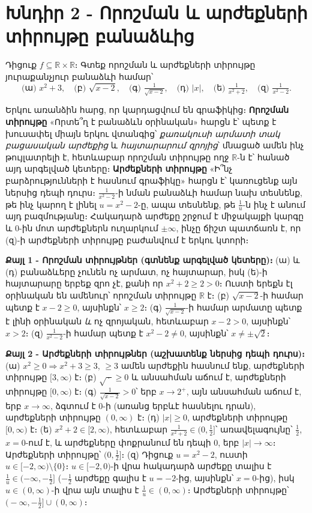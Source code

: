 \documentclass[11pt,a4paper]{article}
\newcommand{\R}{\mathbb{R}}
\begin{document}
\section*{Խնդիր 2 - Որոշման և արժեքների տիրույթը բանաձևից}

\begin{problembox}[2]
Դիցուք $f\subseteq\R\times\R$։ Գտեք որոշման և արժեքների տիրույթը յուրաքանչյուր բանաձևի համար՝
\[
\text{(ա) } x^2+3,\quad
\text{(բ) } \sqrt{x-2},\quad
\text{(գ) } \tfrac{1}{\sqrt{x-2}},\quad
\text{(դ) } |x|,\quad
\text{(ե) } \tfrac{1}{x^2+2},\quad
\text{(զ) } \tfrac{1}{x^2-2}.
\]
\end{problembox}

\begin{ideabox}
Երկու առանձին հարց, որ կարդացվում են գրաֆիկից։ \textbf{Որոշման տիրույթը} «Որտե՞ղ է բանաձևն
օրինական» հարցն է՝ պետք է խուսափել միայն երկու վտանգից՝ \emph{քառակուսի արմատի տակ բացասական արժեքից}
և \emph{հայտարարում զրոյից}՝ մնացած ամեն ինչ թույլատրելի է, հետևաբար որոշման տիրույթը ողջ $\R$-ն է՝
հանած այդ արգելված կետերը։ \textbf{Արժեքների տիրույթը} «Ի՞նչ բարձրությունների է հասնում գրաֆիկը»
հարցն է՝ կառուցենք այն ներսից դեպի դուրս։ $\tfrac{1}{x^2-2}$-ի նման բանաձևի համար նախ տեսնենք, թե ինչ
կարող է լինել $u=x^2-2$-ը, ապա տեսնենք, թե $\tfrac1u$-ն ինչ է անում այդ բազմությանը։ Հակադարձ արժեքը
շրջում է միջակայքի կարգը և $0$-ին մոտ արժեքներն ուղարկում $\pm\infty$, ինչը ճիշտ պատճառն է, որ (զ)-ի
արժեքների տիրույթը բաժանվում է երկու կտորի։
\end{ideabox}

\textbf{Քայլ 1 - Որոշման տիրույթներ (գտնենք արգելված կետերը)։}
(ա) և (դ) բանաձևերը չունեն ոչ արմատ, ոչ հայտարար, իսկ (ե)-ի հայտարարը երբեք զրո չէ, քանի որ
$x^2+2\ge2>0$։ Ուստի երեքն էլ օրինական են ամենուր՝ որոշման տիրույթը $\R$ է։ (բ) $\sqrt{x-2}$-ի համար պետք է $x-2\ge0$, այսինքն՝ $x\ge2$։ (գ)
$\tfrac1{\sqrt{x-2}}$-ի համար արմատը պետք է լինի օրինական \emph{և} ոչ զրոյական, հետևաբար $x-2>0$,
այսինքն՝ $x>2$։ (զ) $\tfrac1{x^2-2}$-ի համար պետք է $x^2-2\ne0$, այսինքն՝ $x\ne\pm\sqrt2$։

\textbf{Քայլ 2 - Արժեքների տիրույթներ (աշխատենք ներսից դեպի դուրս)։}
(ա) $x^2\ge0\Rightarrow x^2+3\ge3$, $\ge3$ ամեն արժեքին հասնում ենք, արժեքների տիրույթը $[3,\infty)$ է։
(բ) $\sqrt{\,\cdot\,}\ge0$ և անսահման աճում է, արժեքների տիրույթը $[0,\infty)$ է։
(գ) $\tfrac1{\sqrt{x-2}}>0$՝ երբ $x\to2^+$, այն անսահման աճում է, երբ $x\to\infty$, ձգտում է $0$-ի (առանց
երբևէ հասնելու դրան), արժեքների տիրույթը $(0,\infty)$ է։
(դ) $|x|\ge0$, արժեքների տիրույթը $[0,\infty)$ է։
(ե) $x^2+2\in[2,\infty)$, հետևաբար $\tfrac1{x^2+2}\in(0,\tfrac12]$՝ առավելագույնը՝ $\tfrac12$, $x=0$-ում է,
և արժեքները փոքրանում են դեպի $0$, երբ $|x|\to\infty$։ Արժեքների տիրույթը՝
$\bigl(0,\tfrac12\bigr]$։
(զ) Դիցուք $u=x^2-2$, ուստի $u\in[-2,\infty)\setminus\{0\}$։ $u\in[-2,0)$-ի վրա հակադարձ արժեքը տալիս է
$\tfrac1u\in(-\infty,-\tfrac12]$ ($-\tfrac12$ արժեքը գալիս է $u=-2$-ից, այսինքն՝ $x=0$-ից), իսկ
$u\in(0,\infty)$-ի վրա այն տալիս է $\tfrac1u\in(0,\infty)$։ Արժեքների տիրույթը՝
$\bigl(-\infty,-\tfrac12\bigr]\cup(0,\infty)$։
\end{document}
